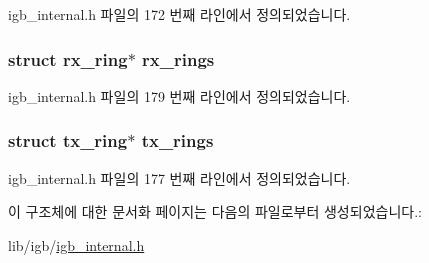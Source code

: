 igb\+\_\+internal.\+h 파일의 172 번째 라인에서 정의되었습니다.

\subsubsection[{\texorpdfstring{rx\+\_\+rings}{rx_rings}}]{\setlength{\rightskip}{0pt plus 5cm}struct {\bf rx\+\_\+ring}$\ast$ rx\+\_\+rings}\hypertarget{structadapter_a59a5588ccfe1b0eefe45fcb9188b2f0a}{}\label{structadapter_a59a5588ccfe1b0eefe45fcb9188b2f0a}


igb\+\_\+internal.\+h 파일의 179 번째 라인에서 정의되었습니다.

\subsubsection[{\texorpdfstring{tx\+\_\+rings}{tx_rings}}]{\setlength{\rightskip}{0pt plus 5cm}struct {\bf tx\+\_\+ring}$\ast$ tx\+\_\+rings}\hypertarget{structadapter_aec689462327aa3bf0e8a73e7cca2ae55}{}\label{structadapter_aec689462327aa3bf0e8a73e7cca2ae55}


igb\+\_\+internal.\+h 파일의 177 번째 라인에서 정의되었습니다.



이 구조체에 대한 문서화 페이지는 다음의 파일로부터 생성되었습니다.\+:\begin{DoxyCompactItemize}
\item 
lib/igb/\hyperlink{igb__internal_8h}{igb\+\_\+internal.\+h}\end{DoxyCompactItemize}
